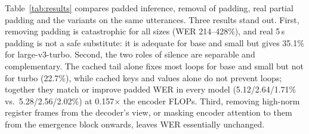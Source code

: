 Table~\ref{tab:results} compares padded inference, removal of padding, real partial padding and the \method{} variants on the same utterances. Three results stand out. First, removing padding is catastrophic for all sizes (WER 214--428\%), and real 5\,s padding is not a safe substitute: it is adequate for base and small but gives 35.1\% for large-v3-turbo. Second, the two roles of silence are separable and complementary. The cached tail alone fixes most loops for base and small but not for turbo (22.7\%), while cached keys and values alone do not prevent loops; together they match or improve padded WER in every model (5.12/2.64/1.71\% vs.\ 5.28/2.56/2.02\%) at 0.157$\times$ the encoder FLOPs. Third, removing high-norm register frames from the decoder's view, or masking encoder attention to them from the emergence block onwards, leaves WER essentially unchanged.


